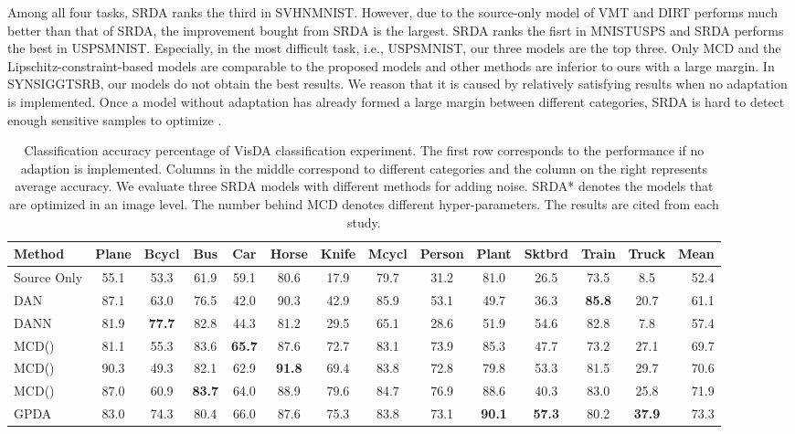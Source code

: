 \documentclass[journal,twocolumn]{IEEEtran}
\theoremstyle{definition}
\begin{document}
Among all four tasks, SRDA ranks the third in SVHNMNIST. However, due to the source-only model of VMT and DIRT performs much better than that of SRDA, the improvement bought from SRDA is the largest.  SRDA ranks the fisrt in MNISTUSPS and SRDA performs the best in USPSMNIST. Especially, in the most difficult task, i.e., USPSMNIST, our three models are the top three. Only MCD and the Lipschitz-constraint-based models are comparable to the proposed models and other methods are inferior to ours with a large margin. In SYNSIGGTSRB, our models do not obtain the best results. We reason that it is caused by relatively satisfying results when no adaptation is implemented. Once a model without adaptation has already formed a large margin between different categories, SRDA is hard to detect enough sensitive samples to optimize .
\begin{table*}[htbp]
\centering
\caption{Classification accuracy percentage of VisDA classification experiment. The first row corresponds to the performance if no adaption is implemented. Columns in the middle correspond to different categories and the column on the right represents average accuracy. We evaluate three SRDA models with different methods for adding noise. SRDA* denotes the models that are optimized in an image level. The number behind MCD denotes different hyper-parameters. The results are cited from each study.}
\label{tab:visda}
\begin{tabular}{l|cccccccccccc|r}
\hline\hline
Method&Plane&Bcycl&Bus&Car&Horse&Knife&Mcycl&Person&Plant&Sktbrd&Train&Truck&Mean\\
\hline
Source Only&55.1&53.3 &61.9 &59.1&80.6&17.9&79.7&31.2&81.0&26.5&73.5&8.5&52.4\\
\hline
DAN~\cite{pmlr-v37-long15}&87.1&63.0&76.5&42.0&90.3&42.9&85.9&53.1&49.7&
36.3&{\bf 85.8}&20.7&61.1\\
DANN~\cite{ganin2016domain}&81.9&{\bf 77.7}&82.8&44.3&81.2&29.5&65.1&28.6&
51.9&54.6&82.8&7.8&57.4\\
MCD()~\cite{saito2018maximum}&81.1&55.3&83.6&{\bf 65.7}&87.6&72.7&83.1&73.9&85.3&
47.7&73.2&27.1&69.7\\
MCD()~\cite{saito2018maximum}&90.3&49.3&82.1&62.9&{\bf 91.8}&69.4&83.8&72.8&79.8&
53.3&81.5&29.7&70.6\\
MCD()~\cite{saito2018maximum}&87.0&60.9&{\bf 83.7}&64.0&88.9&79.6&84.7&76.9&88.6&
40.3&83.0&25.8&71.9\\
GPDA~\cite{8953535}&83.0&74.3&80.4&66.0&87.6&75.3&83.8&73.1&{\bf 90.1}&
{\bf 57.3}&80.2&{\bf 37.9}&73.3\\

\end{tabular}
\end{table*}
\end{document}
